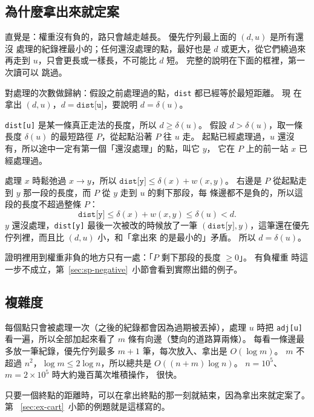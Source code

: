 \subsection{為什麼拿出來就定案}
\label{sec:sp-dijkstra-proof}

直覺是：權重沒有負的，路只會越走越長。 優先佇列最上面的 $(d, u)$ 是所有還沒
處理的紀錄裡最小的；任何還沒處理的點，最好也是 $d$ 或更大，從它們繞過來再走到
$u$，只會更長或一樣長，不可能比 $d$ 短。 完整的說明在下面的框裡，第一次讀可以
跳過。

\begin{whybox}
對處理的次數做歸納：假設之前處理過的點，\texttt{dist} 都已經等於最短距離。 現
在拿出 $(d, u)$，$d = \texttt{dist[u]}$，要說明 $d = \delta(u)$。

\texttt{dist[u]} 是某一條真正走法的長度，所以 $d \ge \delta(u)$。 假設 $d >
\delta(u)$，取一條長度 $\delta(u)$ 的最短路徑 $P$，從起點沿著 $P$ 往 $u$ 走。
起點已經處理過，$u$ 還沒有，所以途中一定有第一個「還沒處理」的點，叫它 $y$，
它在 $P$ 上的前一站 $x$ 已經處理過。

處理 $x$ 時鬆弛過 $x \to y$，所以 $\texttt{dist[y]} \le \delta(x) + w(x, y)$。
右邊是 $P$ 從起點走到 $y$ 那一段的長度，而 $P$ 從 $y$ 走到 $u$ 的剩下那段，每
條邊都不是負的，所以這段的長度不超過整條 $P$：
\[
\texttt{dist[y]} \le \delta(x) + w(x, y) \le \delta(u) < d.
\]
$y$ 還沒處理，\texttt{dist[y]} 最後一次被改的時候放了一筆
$(\texttt{dist[y]}, y)$，這筆還在優先佇列裡，而且比 $(d, u)$ 小，和「拿出來
的是最小的」矛盾。 所以 $d = \delta(u)$。

證明裡用到權重非負的地方只有一處：「$P$ 剩下那段的長度 $\ge 0$」。 有負權重
時這一步不成立，第~\ref{sec:sp-negative}~小節會看到實際出錯的例子。
\end{whybox}

\subsection{複雜度}

每個點只會被處理一次（之後的紀錄都會因為過期被丟掉），處理 $u$ 時把
\texttt{adj[u]} 看一遍，所以全部加起來看了 $m$ 條有向邊（雙向的道路算兩條）。
每看一條邊最多放一筆紀錄，優先佇列最多 $m + 1$ 筆，每次放入、拿出是
$O(\log m)$。 $m$ 不超過 $n^2$，$\log m \le 2 \log n$，所以總共是
$O((n + m) \log n)$。 $n = 10^5$、$m = 2 \times 10^5$ 時大約幾百萬次堆積操作，
很快。

只要一個終點的距離時，可以在拿出終點的那一刻就結束，因為拿出來就定案了。 第~
\ref{sec:ex-cart}~小節的例題就是這樣寫的。

